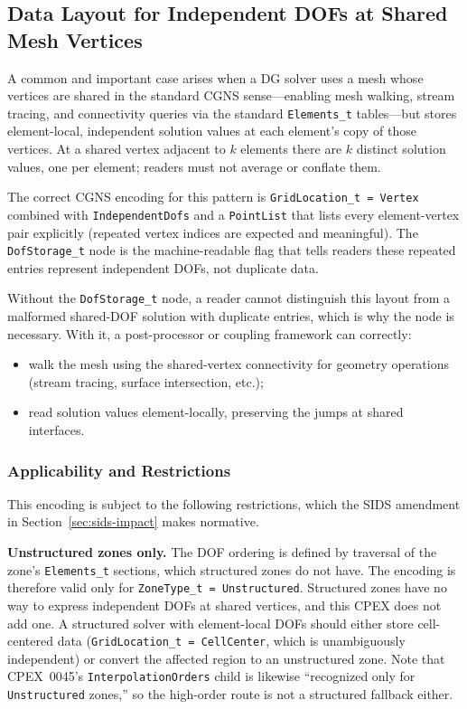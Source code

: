 \documentclass[11pt,letterpaper]{article}
\begin{document}
\subsection{Data Layout for Independent DOFs at Shared Mesh Vertices}
\label{sec:shared-vertex-layout}

A common and important case arises when a DG solver uses a mesh whose
vertices are shared in the standard CGNS sense---enabling mesh walking,
stream tracing, and connectivity queries via the standard
\texttt{Elements\_t} tables---but stores element-local, independent
solution values at each element's copy of those vertices.  At a shared
vertex adjacent to $k$ elements there are $k$ distinct solution values,
one per element; readers must not average or conflate them.

The correct CGNS encoding for this pattern is
\texttt{GridLocation\_t = Vertex} combined with
\texttt{IndependentDofs} and a
\texttt{PointList} that lists every element-vertex pair explicitly
(repeated vertex indices are expected and meaningful).  The
\texttt{DofStorage\_t} node is the machine-readable flag that
tells readers these repeated entries represent independent DOFs, not
duplicate data.

Without the \texttt{DofStorage\_t} node, a reader cannot
distinguish this layout from a malformed shared-DOF solution with
duplicate entries, which is why the node is necessary.  With it, a
post-processor or coupling framework can correctly:

\begin{itemize}[leftmargin=2em]
\item walk the mesh using the shared-vertex connectivity for geometry
  operations (stream tracing, surface intersection, etc.);
\item read solution values element-locally, preserving the jumps at
  shared interfaces.
\end{itemize}

\subsubsection{Applicability and Restrictions}
\label{sec:ptlist-restrictions}

This encoding is subject to the following restrictions, which the
SIDS amendment in Section~\ref{sec:sids-impact} makes normative.

\textbf{Unstructured zones only.}  The DOF ordering is defined by
traversal of the zone's \texttt{Elements\_t} sections, which structured
zones do not have.  The encoding is therefore valid only for
\texttt{ZoneType\_t = Unstructured}.  Structured zones have no way to
express independent DOFs at shared vertices, and this CPEX does not
add one.  A structured solver with element-local DOFs should either
store cell-centered data (\texttt{GridLocation\_t = CellCenter}, which
is unambiguously independent) or convert the affected region to an
unstructured zone.  Note that CPEX~0045's \texttt{InterpolationOrders}
child is likewise ``recognized only for \texttt{Unstructured}
zones,'' so the high-order route is not a structured fallback either.
\end{document}
